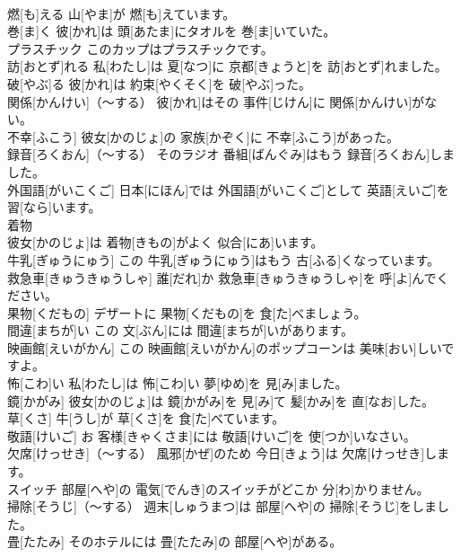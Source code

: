 \documentclass[8pt]{extreport}
\begin{document}
\begin{CJK}{UTF8}{min}
\\	燃[も]える	山[やま]が 燃[も]えています。		
\\	巻[ま]く	彼[かれ]は 頭[あたま]にタオルを 巻[ま]いていた。		
\\	プラスチック	このカップはプラスチックです。		
\\	訪[おとず]れる	私[わたし]は 夏[なつ]に 京都[きょうと]を 訪[おとず]れました。		
\\	破[やぶ]る	彼[かれ]は 約束[やくそく]を 破[やぶ]った。		
\\	関係[かんけい]（～する）	彼[かれ]はその 事件[じけん]に 関係[かんけい]がない。		
\\	不幸[ふこう]	彼女[かのじょ]の 家族[かぞく]に 不幸[ふこう]があった。		
\\	録音[ろくおん]（～する）	そのラジオ 番組[ばんぐみ]はもう 録音[ろくおん]しました。		
\\	外国語[がいこくご]	日本[にほん]では 外国語[がいこくご]として 英語[えいご]を 習[なら]います。		
\\	着物
\\	[きもの]	彼女[かのじょ]は 着物[きもの]がよく 似合[にあ]います。		
\\	牛乳[ぎゅうにゅう]	この 牛乳[ぎゅうにゅう]はもう 古[ふる]くなっています。		
\\	救急車[きゅうきゅうしゃ]	誰[だれ]か 救急車[きゅうきゅうしゃ]を 呼[よ]んでください。		
\\	果物[くだもの]	デザートに 果物[くだもの]を 食[た]べましょう。		
\\	間違[まちが]い	この 文[ぶん]には 間違[まちが]いがあります。		
\\	映画館[えいがかん]	この 映画館[えいがかん]のポップコーンは 美味[おい]しいですよ。		
\\	怖[こわ]い	私[わたし]は 怖[こわ]い 夢[ゆめ]を 見[み]ました。		
\\	鏡[かがみ]	彼女[かのじょ]は 鏡[かがみ]を 見[み]て 髪[かみ]を 直[なお]した。		
\\	草[くさ]	牛[うし]が 草[くさ]を 食[た]べています。		
\\	敬語[けいご]	お 客様[きゃくさま]には 敬語[けいご]を 使[つか]いなさい。		
\\	欠席[けっせき]（～する）	風邪[かぜ]のため 今日[きょう]は 欠席[けっせき]します。		
\\	スイッチ	部屋[へや]の 電気[でんき]のスイッチがどこか 分[わ]かりません。		
\\	掃除[そうじ]（～する）	週末[しゅうまつ]は 部屋[へや]の 掃除[そうじ]をしました。		
\\	畳[たたみ]	そのホテルには 畳[たたみ]の 部屋[へや]がある。		

\end{CJK}
\end{document}
